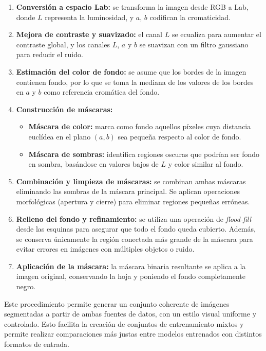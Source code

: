\documentclass[12pt,a4paper]{article}
\begin{document}
\begin{enumerate}
    \item \textbf{Conversión a espacio Lab:} se transforma la imagen desde RGB a Lab, donde $L$ representa la luminosidad, y $a$, $b$ codifican la cromaticidad.
    
    \item \textbf{Mejora de contraste y suavizado:} el canal $L$ se ecualiza para aumentar el contraste global, y los canales $L$, $a$ y $b$ se suavizan con un filtro gaussiano para reducir el ruido.

    \item \textbf{Estimación del color de fondo:} se asume que los bordes de la imagen contienen fondo, por lo que se toma la mediana de los valores de los bordes en $a$ y $b$ como referencia cromática del fondo.

    \item \textbf{Construcción de máscaras:}
    \begin{itemize}
        \item \textbf{Máscara de color:} marca como fondo aquellos píxeles cuya distancia euclídea en el plano $(a,b)$ sea pequeña respecto al color de fondo.
        \item \textbf{Máscara de sombras:} identifica regiones oscuras que podrían ser fondo en sombra, basándose en valores bajos de $L$ y color similar al fondo.
    \end{itemize}

    \item \textbf{Combinación y limpieza de máscaras:} se combinan ambas máscaras eliminando las sombras de la máscara principal. Se aplican operaciones morfológicas (apertura y cierre) para eliminar regiones pequeñas erróneas.

    \item \textbf{Relleno del fondo y refinamiento:} se utiliza una operación de \textit{flood-fill} desde las esquinas para asegurar que todo el fondo queda cubierto. Además, se conserva únicamente la región conectada más grande de la máscara para evitar errores en imágenes con múltiples objetos o ruido.

    \item \textbf{Aplicación de la máscara:} la máscara binaria resultante se aplica a la imagen original, conservando la hoja y poniendo el fondo completamente negro.
\end{enumerate}

Este procedimiento permite generar un conjunto coherente de imágenes segmentadas a partir de ambas fuentes de datos, con un estilo visual uniforme y controlado. Esto facilita la creación de conjuntos de entrenamiento mixtos y permite realizar comparaciones más justas entre modelos entrenados con distintos formatos de entrada.
\end{document}
